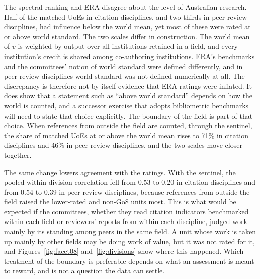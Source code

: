 The spectral ranking and ERA disagree about the level of Australian research. Half of the matched UoEs in citation disciplines, and two thirds in peer review disciplines, had influence below the world mean, yet most of these were rated at or above world standard. The two scales differ in construction. The world mean of $v$ is weighted by output over all institutions retained in a field, and every institution's credit is shared among co-authoring institutions. ERA's benchmarks and the committees' notion of world standard were defined differently, and in peer review disciplines world standard was not defined numerically at all. The discrepancy is therefore not by itself evidence that ERA ratings were inflated. It does show that a statement such as \enquote{above world standard} depends on how the world is counted, and a successor exercise that adopts bibliometric benchmarks will need to state that choice explicitly. The boundary of the field is part of that choice. When references from outside the field are counted, through the sentinel, the share of matched UoEs at or above the world mean rises to 71\% in citation disciplines and 46\% in peer review disciplines, and the two scales move closer together.

The same change lowers agreement with the ratings. With the sentinel, the pooled within-division correlation fell from 0.53 to 0.20 in citation disciplines and from 0.54 to 0.39 in peer review disciplines, because references from outside the field raised the lower-rated and non-Go8 units most. This is what would be expected if the committees, whether they read citation indicators benchmarked within each field or reviewers' reports from within each discipline, judged work mainly by its standing among peers in the same field. A unit whose work is taken up mainly by other fields may be doing work of value, but it was not rated for it, and Figures~\ref{fig:facet08} and~\ref{fig:divisions} show where this happened. Which treatment of the boundary is preferable depends on what an assessment is meant to reward, and is not a question the data can settle.

